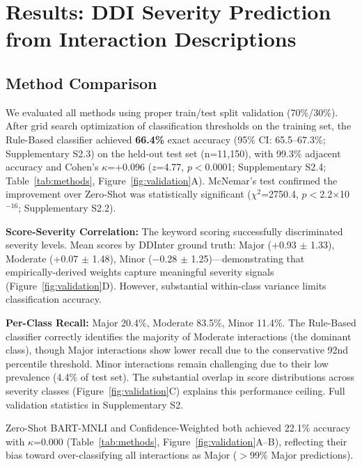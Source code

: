 \documentclass[11pt,a4paper]{article}
\begin{document}
\section*{Results: DDI Severity Prediction from Interaction Descriptions}

\subsection*{Method Comparison}

We evaluated all methods using proper train/test split validation (70\%/30\%). After grid search optimization of classification thresholds on the training set, the Rule-Based classifier achieved \textbf{66.4\%} exact accuracy (95\% CI: 65.5--67.3\%; Supplementary S2.3) on the held-out test set (n=11,150), with 99.3\% adjacent accuracy and Cohen's $\kappa$=+0.096 ($z$=4.77, $p<$0.0001; Supplementary S2.4; Table~\ref{tab:methods}, Figure~\ref{fig:validation}A). McNemar's test confirmed the improvement over Zero-Shot was statistically significant ($\chi^2$=2750.4, $p<$2.2$\times$10$^{-16}$; Supplementary S2.2). 

\textbf{Score-Severity Correlation:} The keyword scoring successfully discriminated severity levels. Mean scores by DDInter ground truth: Major (+0.93 $\pm$ 1.33), Moderate (+0.07 $\pm$ 1.48), Minor ($-$0.28 $\pm$ 1.25)---demonstrating that empirically-derived weights capture meaningful severity signals (Figure~\ref{fig:validation}D). However, substantial within-class variance limits classification accuracy.

\textbf{Per-Class Recall:} Major 20.4\%, Moderate 83.5\%, Minor 11.4\%. The Rule-Based classifier correctly identifies the majority of Moderate interactions (the dominant class), though Major interactions show lower recall due to the conservative 92nd percentile threshold. Minor interactions remain challenging due to their low prevalence (4.4\% of test set). The substantial overlap in score distributions across severity classes (Figure~\ref{fig:validation}C) explains this performance ceiling. Full validation statistics in Supplementary S2.

Zero-Shot BART-MNLI and Confidence-Weighted both achieved 22.1\% accuracy with $\kappa$=0.000 (Table~\ref{tab:methods}, Figure~\ref{fig:validation}A--B), reflecting their bias toward over-classifying all interactions as Major ($>$99\% Major predictions).
\end{document}
